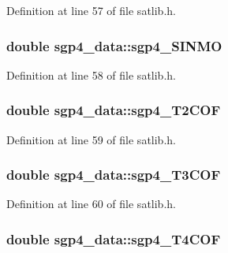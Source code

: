 Definition at line 57 of file satlib.\-h.

\hypertarget{structsgp4__data_ae7c778337c2df4ee1331959013bf6133}{
\subsubsection[{sgp4\-\_\-\-S\-I\-N\-M\-O}]{\setlength{\rightskip}{0pt plus 5cm}double sgp4\-\_\-data\-::sgp4\-\_\-\-S\-I\-N\-M\-O}}\label{structsgp4__data_ae7c778337c2df4ee1331959013bf6133}


Definition at line 58 of file satlib.\-h.

\hypertarget{structsgp4__data_a8af827479f36be8131cb3723946559fd}{
\subsubsection[{sgp4\-\_\-\-T2\-C\-O\-F}]{\setlength{\rightskip}{0pt plus 5cm}double sgp4\-\_\-data\-::sgp4\-\_\-\-T2\-C\-O\-F}}\label{structsgp4__data_a8af827479f36be8131cb3723946559fd}


Definition at line 59 of file satlib.\-h.

\hypertarget{structsgp4__data_a19e836b31fd51a6e99ddb36ae3f27eb8}{
\subsubsection[{sgp4\-\_\-\-T3\-C\-O\-F}]{\setlength{\rightskip}{0pt plus 5cm}double sgp4\-\_\-data\-::sgp4\-\_\-\-T3\-C\-O\-F}}\label{structsgp4__data_a19e836b31fd51a6e99ddb36ae3f27eb8}


Definition at line 60 of file satlib.\-h.

\hypertarget{structsgp4__data_a8cdd605b7feada1a85d8888a4deed744}{
\subsubsection[{sgp4\-\_\-\-T4\-C\-O\-F}]{\setlength{\rightskip}{0pt plus 5cm}double sgp4\-\_\-data\-::sgp4\-\_\-\-T4\-C\-O\-F}}\label{structsgp4__data_a8cdd605b7feada1a85d8888a4deed744}


